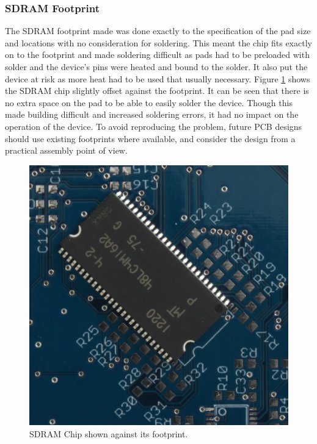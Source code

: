 \subsubsection{SDRAM Footprint}
The SDRAM footprint made was done exactly to the specification of the pad size and locations with no consideration for soldering. This meant the chip fits exactly on to the footprint and made soldering difficult as pads had to be preloaded with solder and the device's pins were heated and bound to the solder. It also put the device at risk as more heat had to be used that usually necessary. Figure \ref{fig:SDRAM_Err} shows the SDRAM chip slightly offset against the footprint. It can be seen that there is no extra space on the pad to be able to easily solder the device. Though this made building difficult and increased soldering errors, it had no impact on the operation of the device. To avoid reproducing the problem, future PCB designs should use existing footprints where available, and consider the design from a practical assembly point of view.

\begin{figure}
\centering
\includegraphics[width=\textwidth / 2]{./Figures/PCB_SDRAM.jpg}
\caption{SDRAM Chip shown against its footprint.}
\label{fig:SDRAM_Err}
\end{figure}


